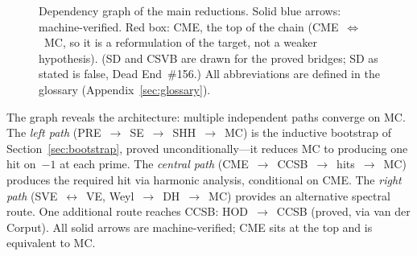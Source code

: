 \begin{figure}[!t]
\caption{Dependency graph of the main reductions.
  Solid {\color{leanink}blue} arrows: machine-verified.
  Red box: CME, the top of the chain (CME~$\iff$~MC, so it is a reformulation of the target, not a weaker hypothesis).  (SD and CSVB are drawn for the
  proved bridges; SD as stated is false, Dead End~\#156.)
  All abbreviations are defined in the glossary
  (Appendix~\ref{sec:glossary}).}
\label{fig:reduction-graph}
\end{figure}

The graph reveals the architecture: multiple independent paths converge
on MC\@.
The \emph{left path} (PRE~$\to$~SE~$\to$~SHH~$\to$~MC) is the
inductive bootstrap of Section~\ref{sec:bootstrap}, proved
unconditionally---it reduces MC to producing one hit on~$-1$ at each
prime.  The \emph{central path}
(CME~$\to$~CCSB~$\to$~hits~$\to$~MC)
produces the required hit via harmonic analysis, conditional on CME\@.  The \emph{right path}
(SVE~$\leftrightarrow$~VE, Weyl~$\to$~DH~$\to$~MC) provides an
alternative spectral route.  One additional route reaches CCSB:
HOD~$\to$~CCSB (proved, via van der Corput).
All solid arrows are machine-verified; CME sits at the top and is equivalent to MC.
